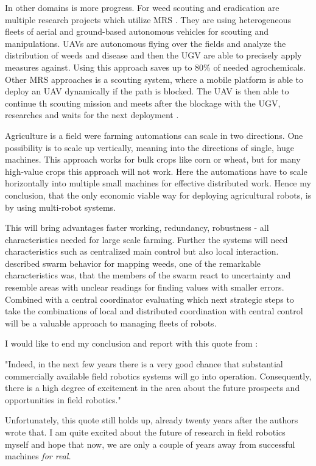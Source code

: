     In other domains is more progress. For weed scouting and eradication are multiple research projects which utilize MRS \cite{ConesaMunoz2015,Albani2019, deSantos2016}. They are using heterogeneous fleets of aerial and ground-based autonomous vehicles for scouting and manipulations. UAVs are autonomous flying over the fields and analyze the distribution of weeds and disease and then the UGV are able to precisely apply measures against. Using this approach saves up to 80\% of needed agrochemicals.
    Other MRS approaches is a scouting system, where a mobile platform is able to deploy an UAV dynamically if the path is blocked. The UAV is then able to continue th scouting mission and meets after the blockage with the UGV, researches and waits for the next deployment \cite{Roldan2016}.

    Agriculture is a field were farming automations can scale in two directions. One possibility is to scale up vertically, meaning into the directions of single, huge machines. This approach works for bulk crops like corn or wheat, but for many high-value crops this approach will not work. Here the automations have to scale horizontally into multiple small machines for effective distributed work. Hence my conclusion, that the only economic viable way for deploying agricultural robots, is by using multi-robot systems.

    This will bring advantages faster working, redundancy, robustness - all characteristics needed for large scale farming. Further the systems will need characteristics such as centralized main control but also local interaction. \cite{Albani2019} described swarm behavior for mapping weeds, one of the remarkable characteristics was, that the members of the swarm react to  uncertainty and resemble areas with unclear readings for finding values with smaller errors. Combined with a central coordinator evaluating which next strategic steps to take the combinations of local and distributed coordination with central control will be a valuable approach to managing fleets of robots.

    I would like to end my conclusion and report with this quote from \cite{Thorpe2001}: 
    \begin{displayquote}[][]
        "Indeed, in the next few years there is a very good chance that substantial commercially available field robotics systems will go into operation. Consequently, there is a high degree of excitement in the area about the future prospects and opportunities in field robotics."
    \end{displayquote}

    Unfortunately, this quote still holds up, already twenty years after the authors wrote that. I am quite excited about the future of research in field robotics myself and hope that now, we are only a couple of years away from successful machines \emph{for real.}

 
